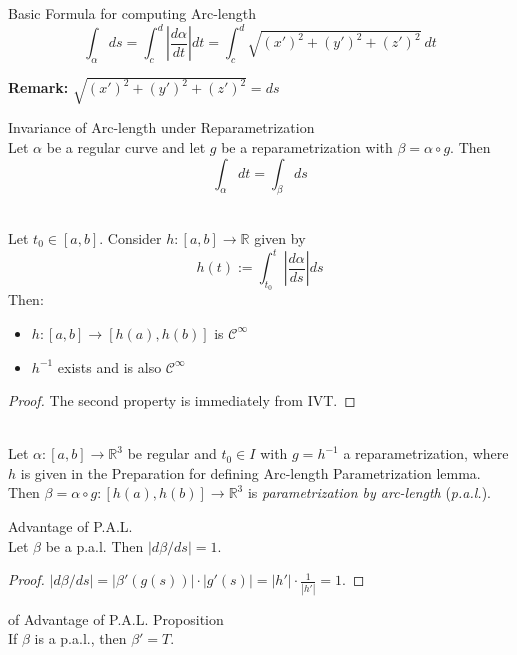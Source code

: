 \begin{proposition}{Basic Formula for computing Arc-length}\\
\[
\int_\alpha ds = \int_c^d\left|\frac{d\alpha}{dt}\right| dt = \int_c^d\sqrt{(x')^2+(y')^2+(z')^2}\ dt
\]
\end{proposition}

\noindent\textbf{Remark:} $\sqrt{(x')^2+(y')^2+(z')^2} = ds$

\begin{proposition}{Invariance of Arc-length under Reparametrization}\\
Let $\alpha$ be a regular curve and let $g$ be a reparametrization with $\beta = \alpha\circ g$. Then
\[
\int_\alpha dt = \int_\beta ds
\]
\end{proposition}

\\
Let $t_0\in[a,b]$. Consider $h:[a,b]\to\mathbb{R}$ given by
\[
h(t) := \int_{t_0}^t \left|\frac{d\alpha}{ds}\right| ds
\]
Then:
\begin{itemize}
\item $h:[a,b]\to[h(a),h(b)]$ is $\mathcal{C}^\infty$
\item $h^{-1}$ exists and is also $\mathcal{C}^\infty$
\end{itemize}

\begin{proof}
The second property is immediately from IVT.
\end{proof}

\\
Let $\alpha:[a,b]\to\mathbb{R}^3$ be regular and $t_0\in I$ with $g=h^{-1}$ a reparametrization, where $h$ is given in the Preparation for defining Arc-length Parametrization lemma. Then $\beta=\alpha\circ g:[h(a),h(b)]\to\mathbb{R}^3$ is \textit{parametrization by arc-length} (\textit{p.a.l.}).

\begin{proposition}{Advantage of P.A.L.}\\
Let $\beta$ be a p.a.l. Then $|d\beta/ds| = 1$.
\end{proposition}

\begin{proof}
$|d\beta/ds| = |\beta'(g(s))|\cdot|g'(s)| = |h'|\cdot\frac{1}{|h'|} = 1$.
\end{proof}

\begin{corollary}{of Advantage of P.A.L. Proposition}\\
If $\beta$ is a p.a.l., then $\beta' = T$.
\end{corollary}

